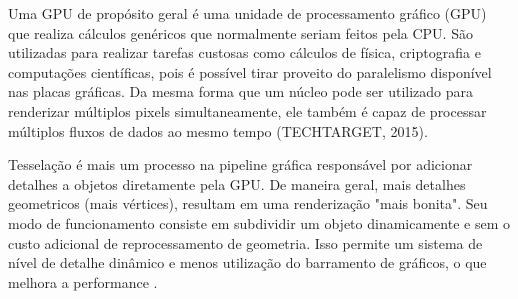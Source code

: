 	\begin{figure}[h!]
		\centering
	\end{figure}

Uma GPU de propósito geral é uma unidade de processamento gráfico (GPU) que realiza cálculos genéricos que normalmente seriam feitos pela CPU. São utilizadas para realizar tarefas custosas como cálculos de física, criptografia e computações científicas, pois é possível tirar proveito do paralelismo disponível nas placas gráficas. Da mesma forma que um núcleo pode ser utilizado para renderizar múltiplos pixels simultaneamente, ele também é capaz de processar múltiplos fluxos de dados ao mesmo tempo (TECHTARGET, 2015)\nocite{GPGPU}.

Tesselação é mais um processo na pipeline gráfica responsável por adicionar detalhes a objetos diretamente pela GPU. De maneira geral, mais detalhes geometricos (mais vértices), resultam em uma renderização "mais bonita". Seu modo de funcionamento consiste em subdividir um objeto dinamicamente e sem o custo adicional de reprocessamento de geometria. Isso permite um sistema de nível de detalhe dinâmico e menos utilização do barramento de gráficos, o que melhora a performance \cite{HLSLBook}.

	\begin{figure}[h!]
		\centering
	\end{figure}
	\nocite{tesselation}

